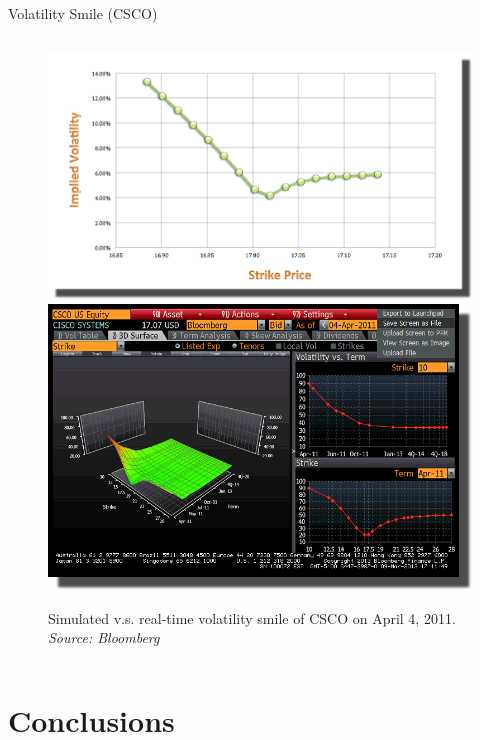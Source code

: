 \documentclass{beamer}
\begin{document}
\begin{frame}[shrink=50]{{\color{cyan}Volatility Smile ({\color{magenta}CSCO})}}
\begin{columns}
\begin{column}{0.7\textwidth}
\begin{figure}[htbp]
                \centering
                \includegraphics[height=0.75\textheight]{CSCO/CSCO_20110404_Simulated_Volatility_Smile.png}\\
                \includegraphics[height=0.75\textheight]{CSCO/CSCO_20110404_B.png}\\
                \caption{Simulated v.s. real-time volatility smile of CSCO on April 4, 2011. \textit{Source: Bloomberg}}
                \label{fig:CSCO_VolSmile_SimvsReal}
\end{figure}
\end{column}
\end{columns}

\end{frame}

\section{Conclusions}
\end{document}
